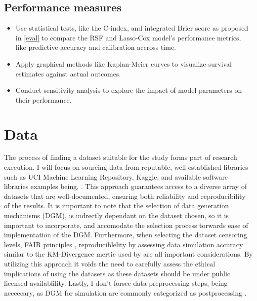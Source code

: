 \subsection{Performance measures}
\begin{itemize}
\item Use statistical tests, like the C-index, and integrated Brier score as proposed in \ref{eval} to compare the RSF and Lasso-Cox model's performance metrics, like predictive accuracy and calibration accross time.
\item Apply graphical methods like Kaplan-Meier curves to visualize survival estimates against actual outcomes.
\item Conduct sensitivity analysis to explore the impact of model parameters on their performance.
\end{itemize}

\section{Data}
\noindent The process of finding a dataset suitable for the study forms part of research execution. I will focus on sourcing data from reputable, well-established libraries such as UCI Machine Learning Repository, Kaggle, and available software libraries examples being, \parencite{nagpal_auton-survival_2022} \parencite{davidson-pilon_lifelines_2024} \parencite{sebastian_polsterl_scikit-survival_2023}. This approach guarantees access to a diverse array of datasets that are well-documented, ensuring both reliability and reproducibility of the results. It is important to note that the selection of data generation mechanisms (DGM), is indrectly dependant on the dataset chosen, so it is important to incorporate, and accomodate the selection process torwards ease of implementation of the DGM. Furthermore, when selecting the dataset censoring levels, FAIR principles \parencite{wilkinson_fair_2016}, reproduciblelity by assessing data simulation accuracy similar to the KM-Divergence mertic used by \parencite{norcliffe_survivalgan_2023} are all important considerations. By utilizing this approach it voids the need to carefully assess the ethical implications of using the datasets as these datasets should be under public licensed availablility. Lastly, I don't forsee data preprocessing steps, being neccecary, as DGM for simulation are commonly categorized as postprocessing \parencite{jin_imputation_2024}. 

